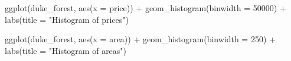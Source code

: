 \documentclass[
  letterpaper,
  DIV=11,
  numbers=noendperiod,
  oneside]{scrartcl}
\newenvironment{Shaded}{}{}
\newcommand{\AttributeTok}[1]{\textcolor[rgb]{0.49,0.56,0.16}{#1}}
\newcommand{\DecValTok}[1]{\textcolor[rgb]{0.25,0.63,0.44}{#1}}
\newcommand{\FunctionTok}[1]{\textcolor[rgb]{0.02,0.16,0.49}{#1}}
\newcommand{\NormalTok}[1]{#1}
\newcommand{\SpecialCharTok}[1]{\textcolor[rgb]{0.25,0.44,0.63}{#1}}
\newcommand{\StringTok}[1]{\textcolor[rgb]{0.25,0.44,0.63}{#1}}
\begin{document}
\begin{Shaded}
\begin{Highlighting}[]
\FunctionTok{ggplot}\NormalTok{(duke\_forest, }\FunctionTok{aes}\NormalTok{(}\AttributeTok{x =}\NormalTok{ price)) }\SpecialCharTok{+}
  \FunctionTok{geom\_histogram}\NormalTok{(}\AttributeTok{binwidth =} \DecValTok{50000}\NormalTok{) }\SpecialCharTok{+}
  \FunctionTok{labs}\NormalTok{(}\AttributeTok{title =} \StringTok{"Histogram of prices"}\NormalTok{)}

\FunctionTok{ggplot}\NormalTok{(duke\_forest, }\FunctionTok{aes}\NormalTok{(}\AttributeTok{x =}\NormalTok{ area)) }\SpecialCharTok{+}
  \FunctionTok{geom\_histogram}\NormalTok{(}\AttributeTok{binwidth =} \DecValTok{250}\NormalTok{) }\SpecialCharTok{+}
  \FunctionTok{labs}\NormalTok{(}\AttributeTok{title =} \StringTok{"Histogram of areas"}\NormalTok{)}
\end{Highlighting}
\end{Shaded}
\end{document}
